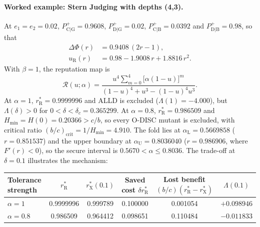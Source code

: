 \documentclass[10pt]{wlscirep}
\newcommand{\Rmap}{\mathscr{R}}            %
\newcommand{\Pp}[1]{P^{+}_{\mathrm{#1}}}   %
\newcommand{\rR}{r_{\mathrm{R}}^{*}}
\newcommand{\rX}{r_{\mathrm{X}}^{*}}
\newcommand{\Hmin}{H_{\min}}
\theoremstyle{plain}
\theoremstyle{remark}
\begin{document}
\paragraph{Worked example: Stern Judging with depths (4,3).} At $e_1=e_2=0.02$, $\Pp{C|G}=0.9608$, $\Pp{D|G}=0.02$, $\Pp{C|B}=0.0392$ and $\Pp{D|B}=0.98$, so that
\begin{equation}
\begin{aligned}
\Delta\Phi(r)&=0.9408\,(2r-1),\\
u_{\mathrm R}(r)&=0.98-1.9008\,r+1.8816\,r^2.
\end{aligned}
\label{eq:s-example-functions}
\end{equation}
With $\beta=1$, the reputation map is
\begin{equation}
\Rmap(u;\alpha)=\frac{u^4\sum_{m=0}^{4}\bigl[\alpha(1-u)\bigr]^m}{(1-u)^4+u^3-(1-u)^4u^3}.
\label{eq:s-example-map}
\end{equation}
At $\alpha=1$, $\rR=0.9999996$ and ALLD is excluded ($\Lambda(1)=-4.000$), but $\Lambda(\delta)>0$ for $0<\delta<\delta_c=0.365299$. At $\alpha=0.8$, $\rR=0.986509$ and $\Hmin=H(0)=0.20366>c/b$, so every O-DISC mutant is excluded, with critical ratio $(b/c)_{\mathrm{crit}}=1/\Hmin=4.910$. The fold lies at $\alpha_{\mathrm L}=0.5669858$ ($r=0.851537$) and the upper boundary at $\alpha_{\mathrm U}=0.8036040$ ($r=0.986906$, where $F'(r)<0$), so the secure interval is $0.5670<\alpha\leq0.8036$. The trade-off at $\delta=0.1$ illustrates the mechanism:
\begin{center}
\small
\begin{tabular}{@{}lccccc@{}}
\toprule
Tolerance strength & $\rR$ & $\rX(0.1)$ & Saved cost $\delta\rR$ & Lost benefit $(b/c)(\rR-\rX)$ & $\Lambda(0.1)$\\
\midrule
$\alpha=1$ & 0.9999996 & 0.999789 & 0.100000 & 0.001054 & $+0.098946$\\
$\alpha=0.8$ & 0.986509 & 0.964412 & 0.098651 & 0.110484 & $-0.011833$\\
\bottomrule
\end{tabular}
\end{center}
\end{document}
